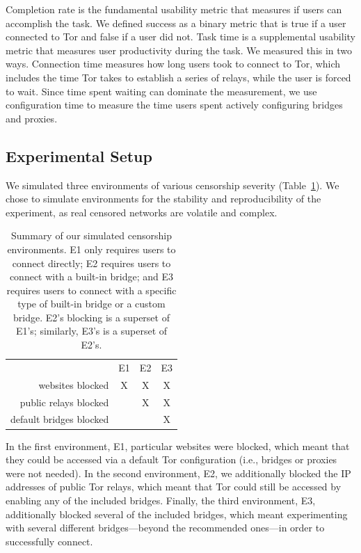 \documentclass[USenglish,oneside,twocolumn]{article}
\begin{document}
Completion rate is the fundamental usability metric that measures if users can accomplish the task. We defined success as a binary metric that is true if a user connected to Tor and false if a user did not. Task time is a supplemental usability metric that measures user productivity during the task. We measured this in two ways. Connection time measures how long users took to connect to Tor, which includes the time Tor takes to establish a series of relays, while the user is forced to wait. Since time spent waiting can dominate the measurement, we use configuration time to measure the time users spent actively configuring bridges and proxies. 

\subsection{Experimental Setup}
\label{sec:environments}
We simulated three environments of various censorship severity (Table~\ref{tab:environments}). We chose to 
simulate environments for the stability and reproducibility of the experiment, as real censored networks are volatile and complex. 

\begin{table}[t]
\centering
\begin{tabular}{r c c c}
& E1 & E2 & E3 \\
websites blocked & X & X & X \\
public relays blocked & & X & X \\
default bridges blocked & & & X \\
\end{tabular}
\caption{
Summary of our simulated censorship environments.
E1 only requires users to connect directly;
E2 requires users to connect with a built-in bridge;
and E3 requires users to connect with a specific type of built-in bridge
or a custom bridge.
E2's blocking is a superset of E1's;
similarly, E3's is a superset of E2's.
}
\label{tab:environments}
\end{table}

In the first environment, E1, particular websites were blocked, which meant that they could be accessed via a default Tor configuration (i.e., bridges or proxies were not needed). In the second environment, E2, we additionally blocked the IP addresses of public Tor relays, which meant that Tor could still be accessed by enabling any of the included bridges. Finally, the third environment, E3, additionally blocked several of the included bridges, which meant experimenting with several different bridges---beyond the recommended ones---in order to successfully connect.
\end{document}
